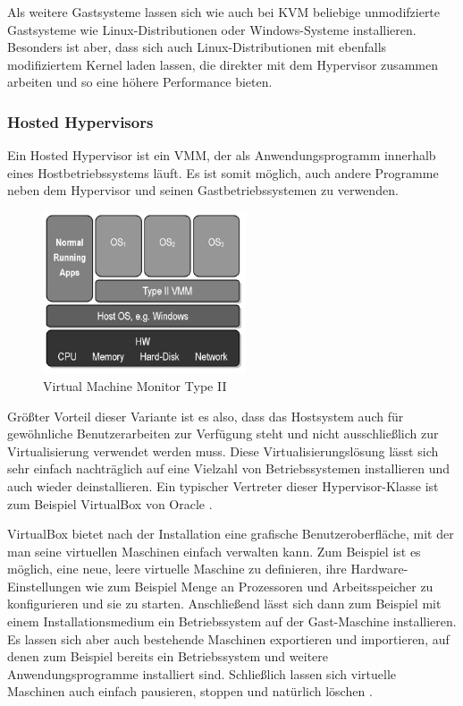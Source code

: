Als weitere Gastsysteme lassen sich wie auch bei KVM beliebige unmodifzierte Gastsysteme wie Linux-Distributionen oder Windows-Systeme installieren. Besonders ist aber, dass sich auch Linux-Distributionen mit ebenfalls modifiziertem Kernel laden lassen, die direkter mit dem Hypervisor zusammen arbeiten und so eine höhere Performance bieten.

\subsubsection{Hosted Hypervisors}

Ein Hosted Hypervisor ist ein \ac{VMM}, der als Anwendungsprogramm innerhalb eines Hostbetriebssystems läuft. Es ist somit möglich, auch andere Programme neben dem Hypervisor und seinen Gastbetriebssystemen zu verwenden.

\begin{figure}[!ht]
  \begin{center}
    \includegraphics[width=6cm]{bilder/VMM-Type2.jpg}
    \caption{Virtual Machine Monitor Type II \citep{wiki:003}}
  \end{center}
\end{figure}

Größter Vorteil dieser Variante ist es also, dass das Hostsystem auch für gewöhnliche Benutzerarbeiten zur Verfügung steht und nicht ausschließlich zur Virtualisierung verwendet werden muss. Diese Virtualisierungslösung lässt sich sehr einfach nachträglich auf eine Vielzahl von Betriebssystemen installieren und auch wieder deinstallieren. Ein typischer Vertreter dieser Hypervisor-Klasse ist zum Beispiel VirtualBox von Oracle \citep[Vgl.][S. 24]{DamMohAnd12}.

VirtualBox bietet nach der Installation eine grafische Benutzeroberfläche, mit der man seine virtuellen Maschinen einfach verwalten kann. Zum Beispiel ist es möglich, eine neue, leere virtuelle Maschine zu definieren, ihre Hardware-Einstellungen wie zum Beispiel Menge an Prozessoren und Arbeitsspeicher zu konfigurieren und sie zu starten. Anschließend lässt sich dann zum Beispiel mit einem Installationsmedium ein Betriebssystem auf der Gast-Maschine installieren. Es lassen sich aber auch bestehende Maschinen exportieren und importieren, auf denen zum Beispiel bereits ein Betriebssystem und weitere Anwendungsprogramme installiert sind. Schließlich lassen sich virtuelle Maschinen auch einfach pausieren, stoppen und natürlich löschen \citep[Vgl.][S. 11 ff.]{Oracle14}.

